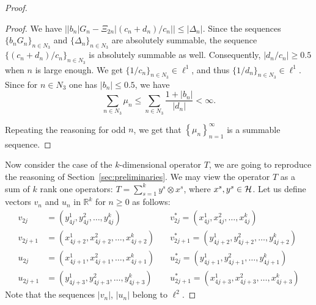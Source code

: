 \begin{proof}
\begin{proof}
        We have $\big\lvert |b_n| G_n - \Xi_{2n}\lvert (c_n + d_n)/c_n \rvert\big\rvert \leq \lvert \Delta_n \rvert$.
        Since the sequences $\{b_n G_n\}_{n\in N_3}$ and $\{\Delta_n\}_{n \in N_3}$ are absolutely summable, the sequence
          $\{(c_n + d_n) / c_n\}_{n\in N_3} $ is absolutely summable as well.
        Consequently, $\lvert d_n/c_n \rvert \geq 0.5$ when $n$ is large enough.
        We get $\{1/c_n\}_{n \in N_3} \in \ell^1$, and thus $\{1/d_n\}_{n \in N_3} \in \ell^1$.
        Since for $n \in N_3$ one has $\lvert b_n \rvert \leq 0.5$, we have
        \[
          \sum_{n\in N_3} \mu_n \leq \sum_{n \in N_3} \frac{1 + \lvert b_n\rvert}{\lvert d_n \rvert} < \infty.
        \]

        Repeating the reasoning for odd $n$, we get that $\left\{\mu_n\right\}_{n=1}^\infty$ is a summable sequence.
      \end{proof}
      Now consider the case of the $k$-dimensional operator $T$, we are going to reproduce the reasoning of Section~\ref{sec:preliminaries}.
      We may view the operator $T$ as a sum of $k$ rank one operators: $T = \sum_{s=1}^k y^s \otimes x^s$, where $x^s, y^s \in \cal{H}$.
      Let us define vectors $v_n$ and $u_n$ in $\mathbb{R}^k$ for $n \geq 0 $ as follows:
      \begin{align*}
        v_{2j} &= (y^1_{4j}, y^2_{4j}, \dots ,y^k_{4j}) \quad
        &v^*_{2j} = (x^1_{4j}, x^2_{4j}, \dots ,x^k_{4j}) \\
        v_{2j+1} &= (x^1_{4j+2}, x^2_{4j+2}, \dots ,x^k_{4j+2}) \quad
        &v^*_{2j+1} = (y^1_{4j+2}, y^2_{4j+2}, \dots ,y^k_{4j+2}) \\
        u_{2j} &= (x^1_{4j+1}, x^2_{4j+1}, \dots ,x^k_{4j+1}) \quad
        &u^*_{2j} = (y^1_{4j+1}, y^2_{4j+1}, \dots ,y^k_{4j+1}) \\
        u_{2j+1} &= (y^1_{4j+3}, y^2_{4j+3}, \dots ,y^k_{4j+3}) \quad
        &u^*_{2j+1} = (x^1_{4j+3}, x^2_{4j+3}, \dots ,x^k_{4j+3})
      \end{align*}
      Note that the sequences $\lvert v_n \rvert$, $\lvert u_n \rvert$ belong to $\ell^2$.


\end{proof}
